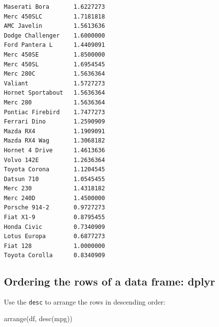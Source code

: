 \documentclass[
]{article}
\newenvironment{Shaded}{\begin{snugshade}}{\end{snugshade}}
\newcommand{\FunctionTok}[1]{\textcolor[rgb]{0.00,0.00,0.00}{#1}}
\newcommand{\NormalTok}[1]{#1}
\begin{document}
\begin{verbatim}
Maserati Bora       1.6227273
Merc 450SLC         1.7181818
AMC Javelin         1.5613636
Dodge Challenger    1.6000000
Ford Pantera L      1.4409091
Merc 450SE          1.8500000
Merc 450SL          1.6954545
Merc 280C           1.5636364
Valiant             1.5727273
Hornet Sportabout   1.5636364
Merc 280            1.5636364
Pontiac Firebird    1.7477273
Ferrari Dino        1.2590909
Mazda RX4           1.1909091
Mazda RX4 Wag       1.3068182
Hornet 4 Drive      1.4613636
Volvo 142E          1.2636364
Toyota Corona       1.1204545
Datsun 710          1.0545455
Merc 230            1.4318182
Merc 240D           1.4500000
Porsche 914-2       0.9727273
Fiat X1-9           0.8795455
Honda Civic         0.7340909
Lotus Europa        0.6877273
Fiat 128            1.0000000
Toyota Corolla      0.8340909
\end{verbatim}

\hypertarget{ordering-the-rows-of-a-data-frame-dplyr-1}{%
\subsection{Ordering the rows of a data frame:
dplyr}\label{ordering-the-rows-of-a-data-frame-dplyr-1}}

Use the \texttt{desc} to arrange the rows in descending order:

\begin{Shaded}
\begin{Highlighting}[]
\FunctionTok{arrange}\NormalTok{(df, }\FunctionTok{desc}\NormalTok{(mpg))}
\end{Highlighting}
\end{Shaded}
\end{document}
